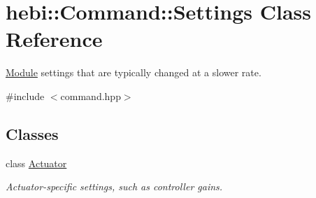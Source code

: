 \hypertarget{classhebi_1_1Command_1_1Settings}{}\section{hebi\+:\+:Command\+:\+:Settings Class Reference}
\label{classhebi_1_1Command_1_1Settings}


\hyperlink{classhebi_1_1Module}{Module} settings that are typically changed at a slower rate.  




{\ttfamily \#include $<$command.\+hpp$>$}

\subsection*{Classes}
\begin{DoxyCompactItemize}
\item 
class \hyperlink{classhebi_1_1Command_1_1Settings_1_1Actuator}{Actuator}
\begin{DoxyCompactList}\small\item\em Actuator-\/specific settings, such as controller gains. \end{DoxyCompactList}\end{DoxyCompactItemize}
